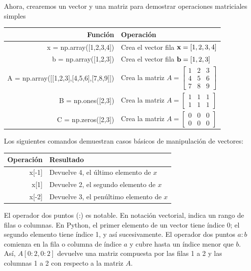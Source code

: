Ahora, crearemos un vector y una matriz para demostrar operaciones matriciales simples \vs

{\footnotesize
\begin{tabular}{r|l}
Función 						& Operación \\
\hline
{\s x = np.array([1,2,3,4])} 	&   Crea el vector fila $\textbf{x} = [1,2,3,4]$\\
{\s b = np.array([1,2,3])}		&   Crea el vector fila $\textbf{b} = [1,2,3]$\\
{\s A = np.array([[1,2,3],[4,5,6],[7,8,9]])}  			&   Crea la matriz $ A = \begin{bmatrix} 1 & 2 & 3\\ 4 & 5 & 6 \\ 7 & 8 & 9 \end{bmatrix} $\\
{\s B = np.ones([2,3])}   		&   Crea la matriz $ A = \begin{bmatrix} 1 & 1 & 1\\ 1 & 1 & 1 \end{bmatrix} $\\
{\s C = np.zeros([2,3])}   		&   Crea la matriz $ A = \begin{bmatrix} 0 & 0 & 0\\ 0 & 0 & 0 \end{bmatrix} $\\
\hline
\end{tabular}
}

\vs
Los siguientes comandos demuestran casos básicos de manipulación de vectores:
\vs

\begin{tabular}{r|l}
Operación 	& Resultado \\
\hline
{\s x[-1]} 	&   Devuelve 4, el último elemento de $x$\\
{\s x[1]} 	&   Devuelve 2, el segundo elemento de $x$\\
{\s x[-2]} 	&  Devuelve 3, el penúltimo elemento de $x$\\
\hline
\end{tabular}

\vs
El operador dos puntos (:) es notable. En notación vectorial, indica un rango de filas o columnas. En Python, el primer elemento de un vector tiene índice 0; el segundo elemento tiene índice 1, y así sucesivamente. El operador dos puntos $a:b$ comienza en la fila o columna de índice $a$ y cubre hasta un índice menor que $b$. Así, $A[0:2,0:2]$ devuelve una matriz compuesta por las filas 1 a 2 y las columnas 1 a 2 con respecto a la matriz $A$.

